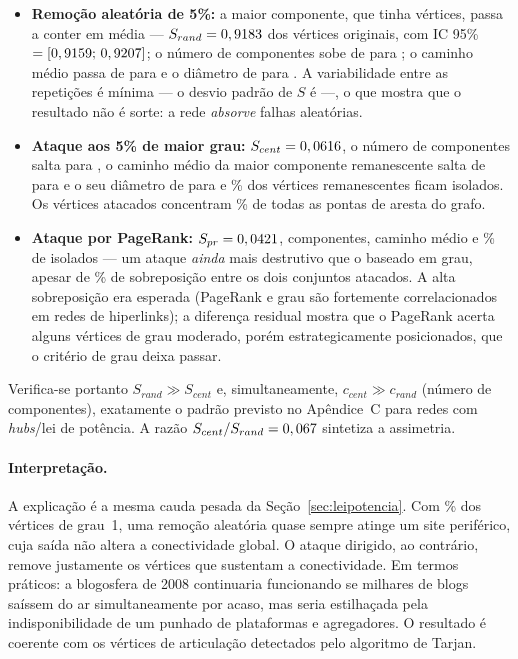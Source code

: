 \documentclass[sigconf]{webmedia}
\begin{document}
\begin{itemize}[nosep]
  \item \textbf{Remoção aleatória de 5\%:} a maior componente, que tinha
        \robSintacto{} vértices, passa a conter em média \robSrandAbs{}
        --- $S_{rand} = 0,9183{}$ dos vértices originais, com
        IC 95\% $=[0,9159{};\,0,9207{}]$; o número de
        componentes sobe de \robCompIntacto{} para \robCompRand{}; o
        caminho médio passa de \robLintacto{} para \robLrand{} e o
        diâmetro de \robDiamIntacto{} para \robDiamRand{}. A
        variabilidade entre as \robT{} repetições é mínima --- o desvio
        padrão de $S$ é \robSrandDP{} ---, o que mostra que o resultado não
        é sorte: a rede \emph{absorve} falhas aleatórias.
  \item \textbf{Ataque aos 5\% de maior grau:} $S_{cent} = 0,0616{}$, o
        número de componentes salta para \robCompCent{}, o caminho médio da
        maior componente remanescente salta de \robLintacto{} para
        \robLcent{} e o seu diâmetro de \robDiamIntacto{} para
        \robDiamCent{} e \robIsoCent{}\% dos vértices remanescentes ficam
        isolados. Os
        \robR{} vértices atacados concentram \robArestasRemovidas{}\% de
        todas as pontas de aresta do grafo.
  \item \textbf{Ataque por PageRank:} $S_{pr} = 0,0421{}$,
        \robCompPr{} componentes, caminho médio \robLpr{} e
        \robIsoPr{}\% de isolados --- um ataque \emph{ainda} mais destrutivo
        que o baseado em grau, apesar de \robSobreposicao{}\% de
        sobreposição entre os dois conjuntos atacados. A alta sobreposição
        era esperada (PageRank e grau são fortemente correlacionados em
        redes de hiperlinks); a diferença residual mostra que o PageRank
        acerta alguns vértices de grau moderado, porém estrategicamente
        posicionados, que o critério de grau deixa passar.
\end{itemize}

Verifica-se portanto $S_{rand} \gg S_{cent}$ e, simultaneamente,
$c_{cent} \gg c_{rand}$ (número de componentes), exatamente o padrão
previsto no Apêndice~C para redes com \textit{hubs}/lei de potência.
A razão $S_{cent}/S_{rand} = 0,067{}$ sintetiza a assimetria.

\paragraph{Interpretação.} A explicação é a mesma cauda pesada da
Seção~\ref{sec:leipotencia}. Com \fracGrauUm{}\% dos vértices de grau~1,
uma remoção aleatória quase sempre atinge um site periférico, cuja saída
não altera a conectividade global. O ataque dirigido, ao contrário,
remove justamente os vértices que sustentam a conectividade. Em termos
práticos: a blogosfera de 2008 continuaria funcionando se milhares de
blogs saíssem do ar simultaneamente por acaso, mas seria estilhaçada pela
indisponibilidade de um punhado de plataformas e agregadores. O resultado
é coerente com os \numArticulacoes{} vértices de articulação detectados
pelo algoritmo de Tarjan.
\end{document}

